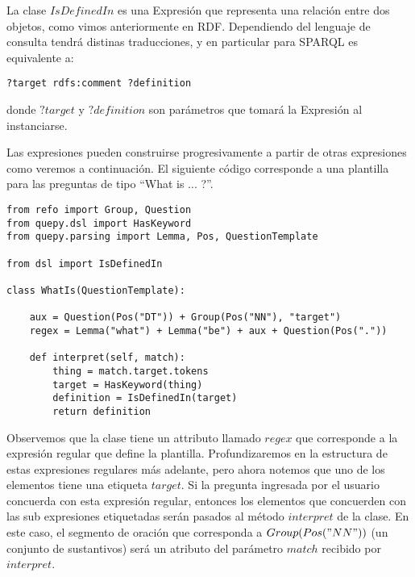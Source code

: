 \vspace{5mm}

La clase $IsDefinedIn$ es una Expresión que representa una relación entre dos objetos, como vimos anteriormente en RDF. Dependiendo del lenguaje de consulta tendrá distinas traducciones, y en particular para SPARQL es equivalente a:

\begin{lstlisting}
?target rdfs:comment ?definition
\end{lstlisting}

donde $?target$ y $?definition$ son parámetros que tomará la Expresión al instanciarse.

Las expresiones pueden construirse progresivamente a partir de otras expresiones como veremos a continuación. El siguiente código corresponde a una plantilla para las preguntas de tipo ``What is ... ?''.

\vspace{5mm}

\begin{lstlisting}
from refo import Group, Question
from quepy.dsl import HasKeyword
from quepy.parsing import Lemma, Pos, QuestionTemplate

from dsl import IsDefinedIn

class WhatIs(QuestionTemplate):

    aux = Question(Pos("DT")) + Group(Pos("NN"), "target")
    regex = Lemma("what") + Lemma("be") + aux + Question(Pos("."))

    def interpret(self, match):
        thing = match.target.tokens
        target = HasKeyword(thing)
        definition = IsDefinedIn(target)
        return definition
\end{lstlisting}

\vspace{5mm}

Observemos que la clase tiene un attributo llamado $regex$ que corresponde a la expresión regular que define la plantilla. Profundizaremos en la estructura de estas expresiones regulares más adelante, pero ahora notemos que uno de los elementos tiene una etiqueta $target$. Si la pregunta ingresada por el usuario concuerda con esta expresión regular, entonces los elementos que concuerden con las sub expresiones etiquetadas serán pasados al método $interpret$ de la clase. En este caso, el segmento de oración que corresponda a $Group(Pos("NN"))$ (un conjunto de sustantivos) será un atributo del parámetro $match$ recibido por $interpret$.


